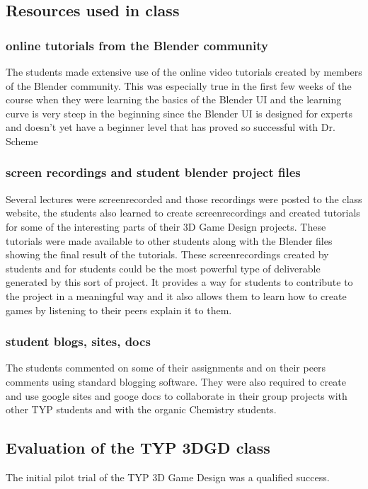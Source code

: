 \documentclass{sig-alternate}
\begin{document}
\subsection{Resources used in class}
\subsubsection{ online tutorials from the Blender community}
The students made extensive use of the online video tutorials created by members of the Blender
community. This was especially true in the first few weeks of the course when they were learning the
basics of the Blender UI and the learning curve is very steep in the beginning since the Blender UI is designed for experts and doesn't yet have a beginner level that has proved so successful with
Dr. Scheme

\subsubsection{screen recordings and student blender project files}
Several lectures were screenrecorded and those recordings were posted to the class website, the
students also learned to create screenrecordings and created tutorials for some of the interesting
parts of their 3D Game Design projects. These tutorials were made available to other students along
with the Blender files showing the final result of the tutorials. These screenrecordings created by
students and for students could be the most powerful type of deliverable generated by this sort of
project. It provides a way for students to contribute to the project in a meaningful way and it also allows
them to learn how to create games by listening to their peers explain it to them. 


\subsubsection{student blogs, sites, docs}
The students commented on some of their assignments and on their peers comments using standard blogging software. They were also required to create and use google sites and googe docs to collaborate in their group projects with other TYP students and with the organic Chemistry students.

\subsection{Evaluation of the TYP 3DGD class}
The initial pilot trial of the TYP 3D Game Design was a qualified success. 
\end{document}
